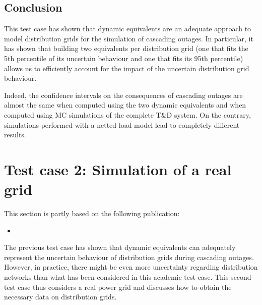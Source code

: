 \subsection{Conclusion}


This test case has shown that dynamic equivalents are an adequate approach to model distribution grids for the simulation of cascading outages. In particular, it has shown that building two equivalents per distribution grid (one that fits the 5th percentile of its uncertain behaviour and one that fits its 95th percentile) allows us to efficiently account for the impact of the uncertain distribution grid behaviour.

Indeed, the confidence intervals on the consequences of cascading outages are almost the same when computed using the two dynamic equivalents and when computed using MC simulations of the complete T\&D system. On the contrary, simulations performed with a netted load model lead to completely different results.



\section{Test case 2: Simulation of a real grid}
\label{sec:distrib_CIGRE}

\begin{tcolorbox}[width=\linewidth, sharp corners=all,
    colback=white!80!black,
    colframe=white!80!black]
This section is partly based on the following publication:
\begin{itemize}
    \item {}
\end{itemize}
\end{tcolorbox}

The previous test case has shown that dynamic equivalents can adequately represent the uncertain behaviour of distribution grids during cascading outages. However, in practice, there might be even more uncertainty regarding distribution networks than what has been considered in this academic test case. This second test case thus considers a real power grid and discusses how to obtain the necessary data on distribution grids.

